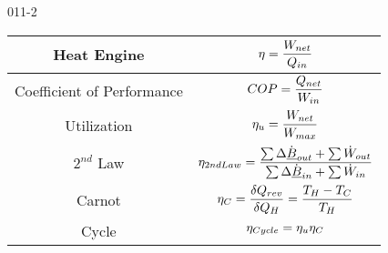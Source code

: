 \begin{mitframe}{011-2}

    
    \begin{tabular}{|c|c|}
	\hline
    Heat Engine & $\heateffic=\dfrac{\work_{net}}{\heatflow_{in}}$ \\ \hline
    Coefficient of Performance & $COP = \dfrac{\heatflow_{net}}{\work_{in}}$\\ \hline
    Utilization & $\heateffic_{\forcepot}=\dfrac{\work_{net}}{\work_{max}}$\\ \hline
    $2^{nd}$ Law & $\heateffic_{2nd Law}=\dfrac{\sum\iipf\dot{\uline{\exergy}}_{out}+\sum\dot{\work}_{out}}{\sum\iipf\dot{\uline{\exergy}}_{in}+\sum\dot{\work}_{in}}$\\ \hline
    Carnot & $\heateffic_{\conc}=\dfrac{\delta\heatflow_{rev}}{\delta\heatflow_{\enthalpy}}=\dfrac{\Temp_{\enthalpy}-\Temp_{\conc}}{\Temp_{\enthalpy}}$\\ \hline
    Cycle & $\heateffic_{Cycle}=\heateffic_{\forcepot}\heateffic_{\conc}$\\ \hline
	\end{tabular}

\end{mitframe}